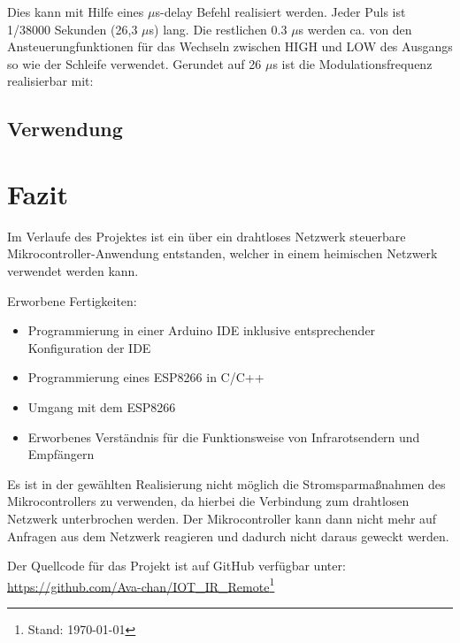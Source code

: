 Dies kann mit Hilfe eines $\mu$s-delay Befehl realisiert werden.
Jeder Puls ist 1/38000 Sekunden (26,3 $\mu$s) lang. Die restlichen 0.3 $\mu$s werden ca. von den Ansteuerungfunktionen für das Wechseln zwischen HIGH und LOW des Ausgangs so wie der Schleife verwendet.
Gerundet auf 26 $\mu$s ist die Modulationsfrequenz realisierbar mit:

\subsection{Verwendung}
\section{Fazit}

Im Verlaufe des Projektes ist ein über ein drahtloses Netzwerk steuerbare Mikrocontroller-Anwendung entstanden, welcher in einem heimischen Netzwerk verwendet werden kann.

Erworbene Fertigkeiten:
\begin{itemize}
	\item Programmierung in einer Arduino \acs{IDE} inklusive entsprechender Konfiguration der \acs{IDE}
	\item Programmierung eines ESP8266 in C/C++
	\item Umgang mit dem ESP8266
	\item Erworbenes Verständnis für die Funktionsweise von Infrarotsendern und Empfängern
\end{itemize} 

Es ist in der gewählten Realisierung nicht möglich die Stromsparmaßnahmen des Mikrocontrollers zu verwenden, da hierbei die Verbindung zum drahtlosen Netzwerk unterbrochen werden. Der Mikrocontroller kann dann nicht mehr auf Anfragen aus dem Netzwerk reagieren und dadurch nicht daraus geweckt werden.

Der Quellcode für das Projekt ist auf GitHub verfügbar unter:\\ \url{https://github.com/Ava-chan/IOT_IR_Remote}\footnote{Stand: \today}

\pagebreak

